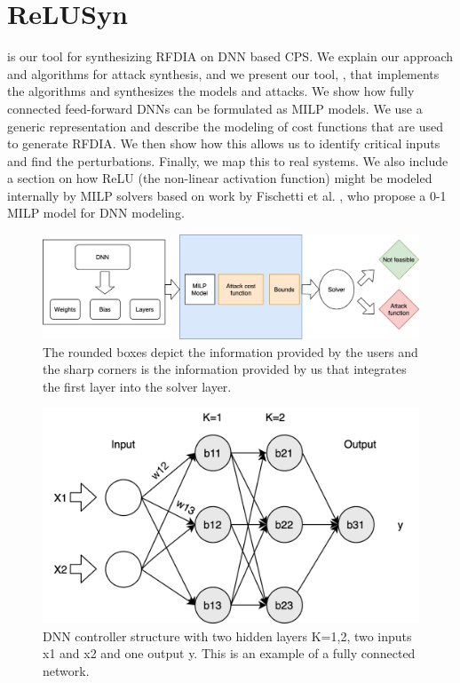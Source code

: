 \chapter{ReLUSyn}
\label{relusyn}
\tool  is our tool for synthesizing \ac{RFDIA}  on \ac{DNN} based \ac{CPS}.
We explain our approach and algorithms for attack synthesis, and we present our tool, \tool, that implements the algorithms and synthesizes the models and attacks. 
We show how fully connected feed-forward \ac{DNN}s can be formulated as \ac{MILP} models. 
We use a generic representation and describe the modeling of cost functions that are used to generate \ac{RFDIA}.
We then show how this allows us to identify critical inputs and find the perturbations. 
Finally, we map this to real systems.
We also include a section on how ReLU (the non-linear activation function) might be modeled internally by MILP solvers based on work by Fischetti et al. \cite{fischetti2017deep}, who propose a 0-1 MILP model for \ac{DNN} modeling.


\begin{figure}
	\centering
	\includegraphics[scale=0.1]{Images/Methodology}
	\caption[Methodology]{The rounded boxes depict the information provided by the users and the sharp corners is the information provided by us that integrates the first layer into the solver layer.}
	\label{fig:methodology}
\end{figure}

\begin{figure}
	\centering
	\includegraphics[width=0.7\linewidth]{Images/DNNstructure}
	\caption[DNN structure]{DNN controller structure with two hidden layers K=1,2, two inputs x1 and x2 and one output y. This is an example of a fully connected network.}
	\label{fig:dnn-controller}
\end{figure}


